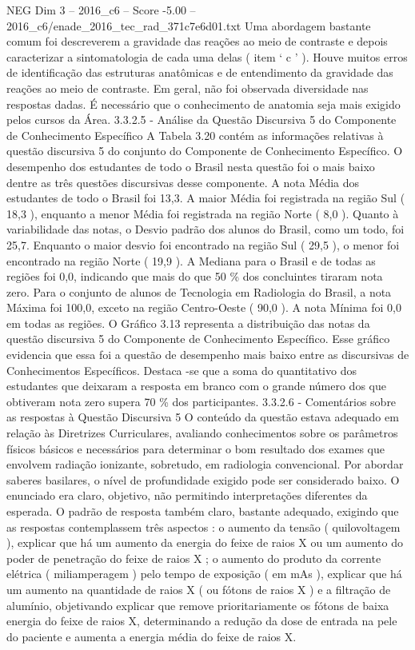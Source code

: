 \begin{textsample}{NEG Dim 3 – 2016\_c6 – Score -5.00 – 2016\_c6/enade\_2016\_tec\_rad\_371c7e6d01.txt}
Uma abordagem bastante comum foi descreverem a gravidade das reações ao meio de contraste e depois caracterizar a sintomatologia de cada uma delas ( item ‘ c ’ ).
Houve muitos erros de identificação das estruturas anatômicas e de entendimento da gravidade das reações ao meio de contraste.
Em geral, não foi observada diversidade nas respostas dadas.
É necessário que o conhecimento de anatomia seja mais exigido pelos cursos da Área. 3.3.2.5 - Análise da Questão Discursiva 5 do Componente de Conhecimento Específico A Tabela 3.20 contém as informações relativas à questão discursiva 5 do conjunto do Componente de Conhecimento Específico.
O desempenho dos estudantes de todo o Brasil nesta questão foi o mais baixo dentre as três questões discursivas desse componente.
A nota Média dos estudantes de todo o Brasil foi 13,3.
A maior Média foi registrada na região Sul ( 18,3 ), enquanto a menor Média foi registrada na região Norte ( 8,0 ).
Quanto à variabilidade das notas, o Desvio padrão dos alunos do Brasil, como um todo, foi 25,7.
Enquanto o maior desvio foi encontrado na região Sul ( 29,5 ), o menor foi encontrado na região Norte ( 19,9 ).
A Mediana para o Brasil e de todas as regiões foi 0,0, indicando que mais do que 50 \% dos concluintes tiraram nota zero.
Para o conjunto de alunos de Tecnologia em Radiologia do Brasil, a nota Máxima foi 100,0, exceto na região Centro-Oeste ( 90,0 ).
A nota Mínima foi 0,0 em todas as regiões.
O Gráfico 3.13 representa a distribuição das notas da questão discursiva 5 do Componente de Conhecimento Específico.
Esse gráfico evidencia que essa foi a questão de desempenho mais baixo entre as discursivas de Conhecimentos Específicos.
Destaca -se que a soma do quantitativo dos estudantes que deixaram a resposta em branco com o grande número dos que obtiveram nota zero supera 70 \% dos participantes. 3.3.2.6 - Comentários sobre as respostas à Questão Discursiva 5 O conteúdo da questão estava adequado em relação às Diretrizes Curriculares, avaliando conhecimentos sobre os parâmetros físicos básicos e necessários para determinar o bom resultado dos exames que envolvem radiação ionizante, sobretudo, em radiologia convencional.
Por abordar saberes basilares, o nível de profundidade exigido pode ser considerado baixo.
O enunciado era claro, objetivo, não permitindo interpretações diferentes da esperada.
O padrão de resposta também claro, bastante adequado, exigindo que as respostas contemplassem três aspectos : o aumento da tensão ( quilovoltagem ), explicar que há um aumento da energia do feixe de raios X ou um aumento do poder de penetração do feixe de raios X ; o aumento do produto da corrente elétrica ( miliamperagem ) pelo tempo de exposição ( em mAs ), explicar que há um aumento na quantidade de raios X ( ou fótons de raios X ) e a filtração de alumínio, objetivando explicar que remove prioritariamente os fótons de baixa energia do feixe de raios X, determinando a redução da dose de entrada na pele do paciente e aumenta a energia média do feixe de raios X.

\end{textsample}
